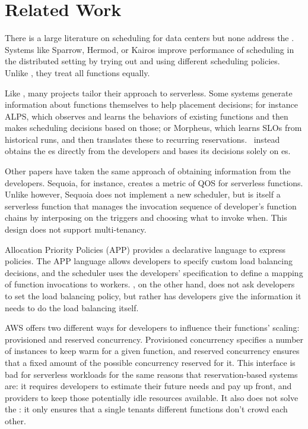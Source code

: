 \section{Related Work}

There is a large literature on scheduling for data centers but none
address the \problem.  Systems like Sparrow\cite{sparrow},
Hermod\cite{hermod}, or Kairos\cite{kairos} improve performance of
scheduling in the distributed setting by trying out and using
different scheduling policies. Unlike \sys{}, they treat all functions
equally.

Like \sys{}, many projects tailor their approach to serverless. Some systems
generate information about functions themselves to help placement decisions; for
instance ALPS\cite{alps}, which observes and learns the behaviors of existing
functions and then makes scheduling decisions based on those; or
Morpheus\cite{morpheus}, which learns SLOs from historical runs, and then
translates these to recurring reservations.~\Sys{} instead obtains the \class{}es
directly from the developers and bases its decisions solely on \class{}es.

Other papers have taken the same approach of obtaining information
from the developers. Sequoia\cite{sequoia}, for instance, creates a
metric of QOS for serverless functions. Unlike \sys{} however, Sequoia
does not implement a new scheduler, but is itself a serverless
function that manages the invocation sequence of developer's function
chains by interposing on the triggers and choosing what to invoke
when. This design does not support multi-tenancy.

Allocation Priority Policies (APP)\cite{app-paper} provides a declarative
language to express policies. The APP
language allows developers to specify custom load balancing
decisions, and the scheduler uses the developers' specification to define a
mapping of function invocations to workers. \Sys{}, on the other hand, does not
ask developers to set the load balancing policy, but rather has developers give
\sys{} the information it needs to do the load balancing itself.

AWS offers two different ways for developers to influence their functions'
scaling: provisioned and reserved concurrency\cite{aws-scaling}. Provisioned
concurrency specifies a number of instances to keep warm for a given function,
and reserved concurrency ensures that a fixed amount of the possible concurrency
reserved for it. This interface is bad for serverless workloads for the same
reasons that reservation-based systems are: it requires developers to estimate
their future needs and pay up front, and providers to keep those potentially
idle resources available. It also does not solve the \problem{}: it only ensures
that a single tenants different functions don't crowd each other.

